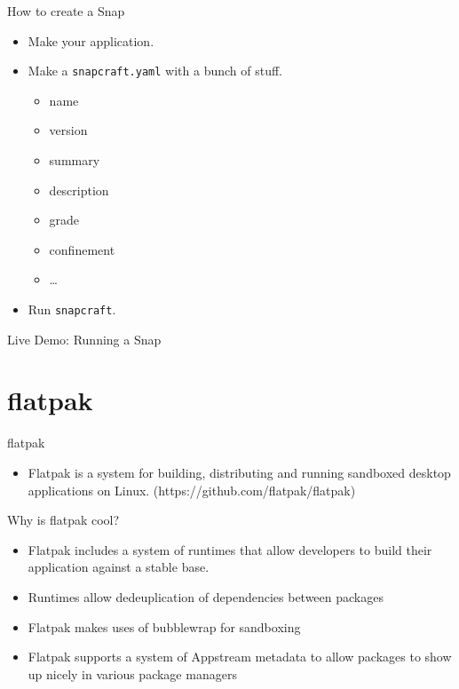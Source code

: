 \documentclass{lug}
\begin{document}
\begin{frame}{How to create a Snap}
    \begin{itemize}
        \item Make your application.
        \item Make a \texttt{snapcraft.yaml} with a bunch of stuff.
            \begin{itemize}
                \item name
                \item version
                \item summary
                \item description
                \item grade
                \item confinement
                \item \dots
            \end{itemize}
        \item Run \texttt{snapcraft}.
    \end{itemize}
\end{frame}

\begin{frame}
    \Huge
    Live Demo: Running a Snap
\end{frame}

\section{flatpak}
\begin{frame}{flatpak}
    \begin{itemize}
        \item Flatpak is a system for building, distributing and running sandboxed desktop applications on Linux. (https://github.com/flatpak/flatpak)
    \end{itemize}
\end{frame}

\begin{frame}{Why is flatpak cool?}
    \begin{itemize}
        \item Flatpak includes a system of runtimes that allow developers to build their application against a stable base.
        \item Runtimes allow dedeuplication of dependencies between packages
        \item Flatpak makes uses of bubblewrap for sandboxing
        \item Flatpak supports a system of Appstream metadata to allow packages to show up nicely in various package managers
    \end{itemize}
\end{frame}
\end{document}
